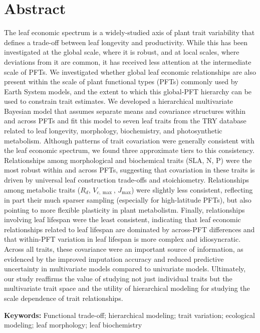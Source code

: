 \documentclass{article}
\begin{document}
\section{Abstract}
The leaf economic spectrum is a widely-studied axis of plant trait variability that defines a trade-off between leaf longevity and productivity.
While this has been investigated at the global scale, where it is robust, and at local scales, where deviations from it are common, it has received less attention at the intermediate scale of PFTs.
We investigated whether global leaf economic relationships are also present within the scale of plant functional types (PFTs) commonly used by Earth System models, and the extent to which this global-PFT hierarchy can be used to constrain trait estimates.
We developed a hierarchical multivariate Bayesian model that assumes separate means and covariance structures within and across PFTs and fit this model to seven leaf traits from the TRY database related to leaf longevity, morphology, biochemistry, and photosynthetic metabolism.
Although patterns of trait covariation were generally consistent with the leaf economic spectrum, we found three approximate tiers to this consistency.
Relationships among morphological and biochemical traits (SLA, N, P) were the most robust within and across PFTs, suggesting that covariation in these traits is driven by universal leaf construction trade-offs and stoichiometry.
Relationships among metabolic traits ($R_d$, $V_{c,\max}$, $J_{\max}$) were slightly less consistent, reflecting in part their much sparser sampling (especially for high-latitude PFTs), but also pointing to more flexible plasticity in plant metabolistm.
Finally, relationships involving leaf lifespan were the least consistent, indicating that leaf economic relationships related to leaf lifespan are dominated by across-PFT differences and that within-PFT variation in leaf lifespan is more complex and idiosyncratic.
Across all traits, these covariance were an important source of information, as evidenced by the improved imputation accuracy and reduced predictive uncertainty in multivariate models compared to univariate models.
Ultimately, our study reaffirms the value of studying not just individual traits but the multivariate trait space and the utility of hierarchical modeling for studying the scale dependence of trait relationships.

\noindent
\textbf{Keywords:} Functional trade-off; hierarchical modeling; trait variation; ecological modeling; leaf morphology; leaf biochemistry
\end{document}
